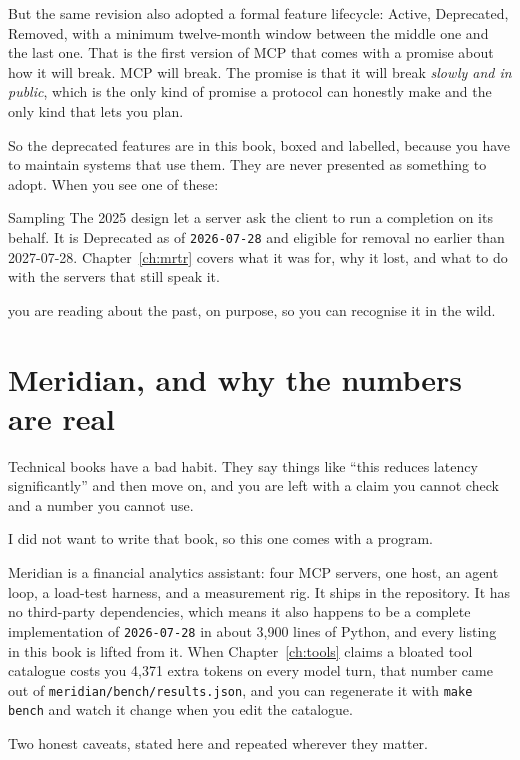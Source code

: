 But the same revision also adopted a formal feature lifecycle: Active,
Deprecated, Removed, with a minimum twelve-month window between the middle one
and the last one. That is the first version of MCP that comes with a promise about how it will
break. MCP will break. The promise is that it will break \emph{slowly and in
public}, which is the only kind of promise a protocol can honestly make and the
only kind that lets you plan.

So the deprecated features are in this book, boxed and labelled, because you
have to maintain systems that use them. They are never presented as something
to adopt. When you see one of these:

\begin{legacybox}{Sampling}
The 2025 design let a server ask the client to run a completion on its behalf.
It is Deprecated as of \texttt{2026-07-28} and eligible for removal no earlier
than 2027-07-28. Chapter~\ref{ch:mrtr} covers what it was for, why it lost, and
what to do with the servers that still speak it.
\end{legacybox}

\noindent you are reading about the past, on purpose, so you can recognise it in
the wild.

\section*{Meridian, and why the numbers are real}

Technical books have a bad habit. They say things like ``this reduces latency
significantly'' and then move on, and you are left with a claim you cannot
check and a number you cannot use.

I did not want to write that book, so this one comes with a program.

Meridian is a financial analytics assistant: four MCP servers, one host, an
agent loop, a load-test harness, and a measurement rig. It ships in the
repository. It has no third-party dependencies, which means it also happens to
be a complete implementation of \texttt{2026-07-28} in about 3,900 lines of
Python, and every listing in this book is lifted from it. When
Chapter~\ref{ch:tools} claims a bloated tool catalogue costs you 4,371 extra
tokens on every model turn, that number came out of
\texttt{meridian/bench/results.json}, and you can regenerate it with
\texttt{make bench} and watch it change when you edit the catalogue.

Two honest caveats, stated here and repeated wherever they matter.

